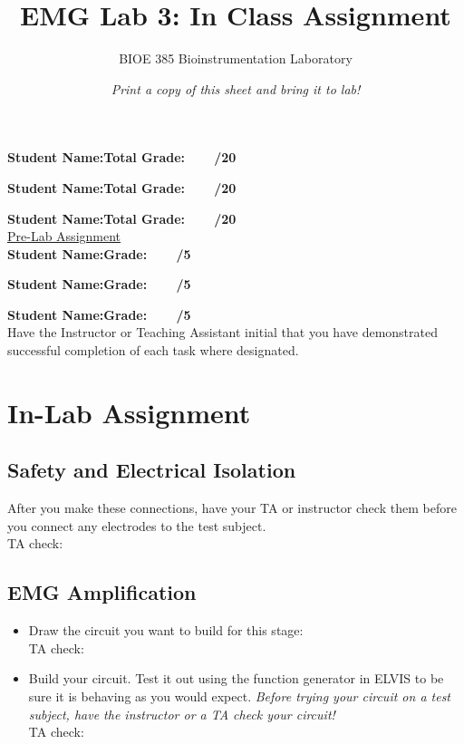 \documentclass{article}
\title{EMG Lab 3: In Class Assignment}
\author{BIOE 385 Bioinstrumentation Laboratory}
\date{\textit{Print a copy of this sheet and bring it to lab!}}
\begin{document}
\large
\maketitle

\textbf{Student Name:}\hfill 	\textbf{Total Grade:\ \ \ \ /20}\vspace{0.5cm}

\textbf{Student Name:}\hfill 	\textbf{Total Grade:\ \ \ \ /20}\vspace{0.5cm}

\textbf{Student Name:}\hfill 	\textbf{Total Grade:\ \ \ \ /20}\\

\underline{Pre-Lab Assignment}\\

\textbf{Student Name:}\hfill 	\textbf{Grade:\ \ \ \ /5}\vspace{0.5cm}

\textbf{Student Name:}\hfill 	\textbf{Grade:\ \ \ \ /5}\vspace{0.5cm}

\textbf{Student Name:}\hfill 	\textbf{Grade:\ \ \ \ /5}\\

Have the Instructor or Teaching Assistant initial that you have demonstrated successful completion of each task where designated.

\section*{In-Lab Assignment}
\subsection*{Safety and Electrical Isolation}
After you make these connections, have your TA or instructor check them before you connect any electrodes to the test subject.\\TA check: \underline{\hspace{2cm}}

\subsection*{EMG Amplification}
\begin{itemize}
	\item Draw the circuit you want to build for this stage:\vspace{5cm}\\TA check: \underline{\hspace{2cm}}\\
	\item Build your circuit. Test it out using the function generator in ELVIS to be sure it is behaving as you would expect. \textit{Before trying your circuit on a test subject, have the instructor or a TA check your circuit!}\\TA check: \underline{\hspace{2cm}}
\end{itemize}
\end{document}
